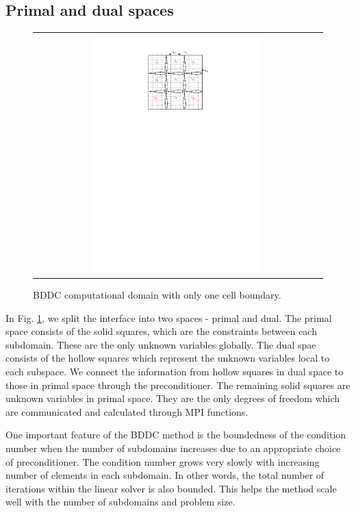 \subsection{Primal and dual spaces}

\begin{figure}[h]
	\centering
	\begin{tabular}{c}
		\includegraphics[width=0.6\textwidth]{./pics/domain3.pdf}
	\end{tabular}
	\caption{\footnotesize BDDC computational domain with only one cell boundary.}\label{fig5: BDDC3}
\end{figure}

In Fig. \ref{fig5: BDDC3}, we split the interface into two spaces - primal and dual. The primal space consists of the solid squares, which are the constraints between each subdomain. These are the only unknown variables globally. The dual spae consists of the hollow squares which represent the unknown variables local to each subspace.  We connect the information from hollow squares in  dual space to those in primal space through the preconditioner. The remaining solid squares are unknown variables in primal space. They are the only degrees of freedom which are communicated and calculated through MPI functions.  

One important feature of the BDDC method is the boundedness of the condition number when the number of subdomains increases due to an appropriate choice of preconditioner. The condition number grows very slowly with increasing number of elements in each subdomain. In other words, the total number of iterations within the linear solver is also bounded. This helps the method scale well with the number of subdomains and problem size. 

